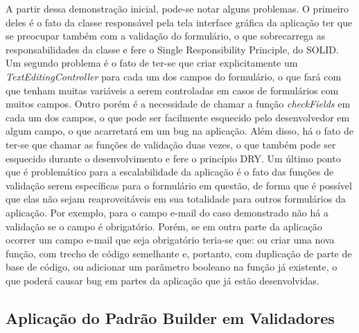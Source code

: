 \documentclass[12pt, %
openright, 
oneside, %
a4paper,    %
brazil]{facom-ufu-abntex2}
\begin{document}
A partir dessa demonstração inicial, pode-se notar alguns problemas. O primeiro deles é o fato da classe responsável pela tela interface gráfica da aplicação ter que se preocupar também com a validação do formulário, o que sobrecarrega as responsabilidades da classe e fere o Single Responsibility Principle, do SOLID. Um segundo problema é o fato de ter-se que criar explicitamente um \textit{TextEditingController} para cada um dos campos do formulário, o que fará com que tenham muitas variáveis a serem controladas em casos de formulários com muitos campos. Outro porém é a necessidade de chamar a função \textit{checkFields} em cada um dos campos, o que pode ser facilmente esquecido pelo desenvolvedor em algum campo, o que acarretará em um bug na aplicação. Além disso, há o fato de ter-se que chamar as funções de validação duas vezes, o que também pode ser esquecido durante o desenvolvimento e fere o princípio DRY. Um último ponto que é problemático para a escalabilidade da aplicação é o fato das funções de validação serem específicas para o formulário em questão, de forma que é possível que elas não sejam reaproveitáveis em sua totalidade para outros formulários da aplicação. Por exemplo, para o campo e-mail do caso demonstrado não há a validação se o campo é obrigatório. Porém, se em outra parte da aplicação ocorrer um campo e-mail que seja obrigatório teria-se que: ou criar uma nova função, com trecho de código semelhante e, portanto, com duplicação de parte de base de código, ou adicionar um parâmetro booleano na função já existente, o que poderá causar bug em partes da aplicação que já estão desenvolvidas.

\subsection{Aplicação do Padrão Builder em Validadores}
\end{document}
